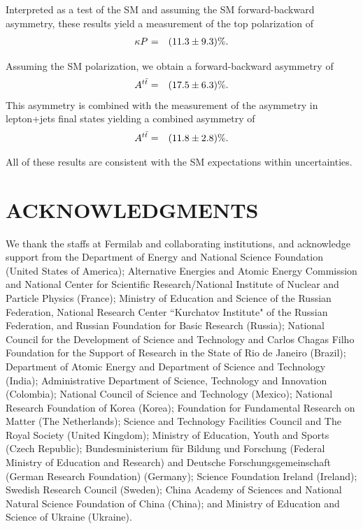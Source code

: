 \documentclass[aps,prd,twocolumn,showpacs,superscriptaddress,groupedaddress,floatfix]{revtex4}
\begin{document}
Interpreted as a test of the SM and assuming the SM forward-backward asymmetry,  these results yield  a measurement of the top polarization of
\begin{eqnarray}
\kappa P^{}_{} &=& (11.3 \pm 9.3)\%. 
\end{eqnarray}



Assuming the SM   polarization, we obtain a forward-backward asymmetry of
\begin{eqnarray}
A^{t\bar t} &=& (17.5 \pm  6.3)\%. 
\end{eqnarray}
This asymmetry is combined with the measurement of the asymmetry in lepton+jets final states yielding a combined asymmetry of
\begin{eqnarray}
A^{t\bar t} &=& (11.8 \pm 2.8)\%.
\end{eqnarray}


All of these results are consistent with the SM expectations within  uncertainties.

 



\section{\label{sec:ackn}ACKNOWLEDGMENTS}
\makeatletter{}
We thank the staffs at Fermilab and collaborating institutions,
and acknowledge support from the
Department of Energy and National Science Foundation (United States of America);
Alternative Energies and Atomic Energy Commission and
National Center for Scientific Research/National Institute of Nuclear and Particle Physics  (France);
Ministry of Education and Science of the Russian Federation, 
National Research Center ``Kurchatov Institute" of the Russian Federation, and 
Russian Foundation for Basic Research  (Russia);
National Council for the Development of Science and Technology and
Carlos Chagas Filho Foundation for the Support of Research in the State of Rio de Janeiro (Brazil);
Department of Atomic Energy and Department of Science and Technology (India);
Administrative Department of Science, Technology and Innovation (Colombia);
National Council of Science and Technology (Mexico);
National Research Foundation of Korea (Korea);
Foundation for Fundamental Research on Matter (The Netherlands);
Science and Technology Facilities Council and The Royal Society (United Kingdom);
Ministry of Education, Youth and Sports (Czech Republic);
Bundesministerium f\"{u}r Bildung und Forschung (Federal Ministry of Education and Research) and 
Deutsche Forschungsgemeinschaft (German Research Foundation) (Germany);
Science Foundation Ireland (Ireland);
Swedish Research Council (Sweden);
China Academy of Sciences and National Natural Science Foundation of China (China);
and
Ministry of Education and Science of Ukraine (Ukraine).
    




\end{document}
